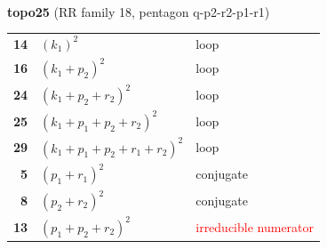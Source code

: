 \documentclass[10pt]{article}
\begin{document}
\begin{minipage}[t]{0.48\textwidth}
{}\\[2mm]\textbf{topo25} (RR family 18, pentagon q-p2-r2-p1-r1)\\[2pt]{\footnotesize\begin{tabular}{@{}r@{\ \ }l@{\ \ }l@{}}\textbf{14} & $(k_1)^2$ & loop\\
\textbf{16} & $(k_1+p_2)^2$ & loop\\
\textbf{24} & $(k_1+p_2+r_2)^2$ & loop\\
\textbf{25} & $(k_1+p_1+p_2+r_2)^2$ & loop\\
\textbf{29} & $(k_1+p_1+p_2+r_1+r_2)^2$ & loop\\
\textbf{5} & $(p_1+r_1)^2$ & conjugate\\
\textbf{8} & $(p_2+r_2)^2$ & conjugate\\
\textbf{13} & $(p_1+p_2+r_2)^2$ & \textcolor{red}{irreducible numerator}\\\end{tabular}}\end{minipage}\hfill%
\end{document}
